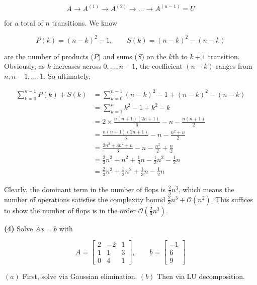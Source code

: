 \documentclass[12pt]{article}
\theoremstyle{definition}
\begin{document}
\begin{equation*}
    A \to A^{(1)} \to A^{(2)} \to  \ldots \to A^{(n-1)} = U
\end{equation*}

for a total of $n$ transitions. We know

\begin{equation*}
    P(k) = (n-k)^2 - 1, \qquad S(k) = (n-k)^2 - (n-k)
\end{equation*}

are the number of products ($P$) and sums ($S$) on the $k$th to $k+1$
transition. Obviously, as $k$ increases across $0, \ldots, n-1$,
the coefficient $(n-k)$ ranges from $n, n-1, \ldots, 1$. So ultimately, 

\begin{align*}
    \sum_{k=0}^{n-1} P(k) + S(k)
    &=\sum_{k=0}^{n-1} (n-k)^2 - 1 + (n-k)^2 - (n-k) \\ 
    &= \sum_{k=1}^n  k^2 - 1 + k^2 - k \\ 
    &= 2\times\frac{n(n+1)(2n+1)}{6} - n - \frac{n(n+1)}{2} \\ 
    &= \frac{n(n+1)(2n+1)}{3} - n - \frac{n^2 + n}{2}\\
    &=\frac{2n^3 + 3n^2 + n }{3} - n -\frac{n^2}{2} + \frac{n}{2} \\ 
    &= \frac{2}{3}n^3 + n^2 + \frac{1}{3}n - \frac{1}{2}n^2 - \frac{1}{2}n  \\ 
    &= \frac{2}{3}n^3 +\frac{1}{2} n^2 + \frac{1}{3}n - \frac{1}{2}n 
\end{align*}

Clearly, the dominant term in the number of flops is $\frac{2}{3}n^3$, which
means the number of operations satisfies the complexity bound $\frac{2}{3}n^3 +
\mathcal{O}(n^2)$. This suffices to show the number of flops is in the order 
$\mathcal{O}\left( \frac{2}{3}n^3 \right) $.

\pagebreak 


\begin{shaded}
    \textbf{(4)} Solve $Ax = b$ with 

    \begin{equation*}
        A = \begin{bmatrix} 
            2 & -2 & 1 \\ 
            1 & 1 & 3 \\ 
            0  & 4 & 1
        \end{bmatrix}, \qquad b = \begin{bmatrix} 
                -1 \\ 6 \\ 9 
        \end{bmatrix} 
    \end{equation*}

    $(a)$ First, solve via Gaussian elimination. $(b)$ Then via LU
    decomposition.
\end{shaded}
\end{document}
